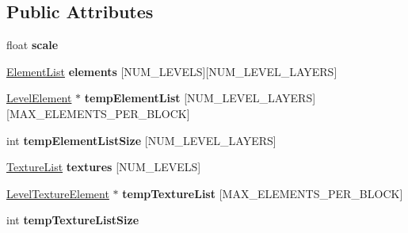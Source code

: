 \subsection*{\-Public \-Attributes}
\begin{DoxyCompactItemize}
\item 
\hypertarget{classLevel_a5fc5b06ee2593eb4b56d6ac761316a5a}{
float {\bfseries scale}}
\label{d2/d9d/classLevel_a5fc5b06ee2593eb4b56d6ac761316a5a}

\item 
\hypertarget{classLevel_a30e1326b2b3c9d96aaec266e6123518a}{
\hyperlink{classLevel_acfda2c619231d9623457ebb133ef6b84}{\-Element\-List} {\bfseries elements} \mbox{[}\-N\-U\-M\-\_\-\-L\-E\-V\-E\-L\-S\mbox{]}\mbox{[}\-N\-U\-M\-\_\-\-L\-E\-V\-E\-L\-\_\-\-L\-A\-Y\-E\-R\-S\mbox{]}}
\label{d2/d9d/classLevel_a30e1326b2b3c9d96aaec266e6123518a}

\item 
\hypertarget{classLevel_a619587a5e40034ebe0f3e6b4c61276a1}{
\hyperlink{classLevelElement}{\-Level\-Element} $\ast$ {\bfseries temp\-Element\-List} \mbox{[}\-N\-U\-M\-\_\-\-L\-E\-V\-E\-L\-\_\-\-L\-A\-Y\-E\-R\-S\mbox{]}\mbox{[}\-M\-A\-X\-\_\-\-E\-L\-E\-M\-E\-N\-T\-S\-\_\-\-P\-E\-R\-\_\-\-B\-L\-O\-C\-K\mbox{]}}
\label{d2/d9d/classLevel_a619587a5e40034ebe0f3e6b4c61276a1}

\item 
\hypertarget{classLevel_aa671d688f9ed322f06a9b66fb7d73f69}{
int {\bfseries temp\-Element\-List\-Size} \mbox{[}\-N\-U\-M\-\_\-\-L\-E\-V\-E\-L\-\_\-\-L\-A\-Y\-E\-R\-S\mbox{]}}
\label{d2/d9d/classLevel_aa671d688f9ed322f06a9b66fb7d73f69}

\item 
\hypertarget{classLevel_a8e49a146fcafe25fa234be3103f1a49a}{
\hyperlink{classLevel_a428c83121a224ffd28a71b01d808352b}{\-Texture\-List} {\bfseries textures} \mbox{[}\-N\-U\-M\-\_\-\-L\-E\-V\-E\-L\-S\mbox{]}}
\label{d2/d9d/classLevel_a8e49a146fcafe25fa234be3103f1a49a}

\item 
\hypertarget{classLevel_a31c9042b0321a0156cab6940f18d84a1}{
\hyperlink{classLevelTextureElement}{\-Level\-Texture\-Element} $\ast$ {\bfseries temp\-Texture\-List} \mbox{[}\-M\-A\-X\-\_\-\-E\-L\-E\-M\-E\-N\-T\-S\-\_\-\-P\-E\-R\-\_\-\-B\-L\-O\-C\-K\mbox{]}}
\label{d2/d9d/classLevel_a31c9042b0321a0156cab6940f18d84a1}

\item 
\hypertarget{classLevel_ac099df327bb9007e550c9c24304cbcc1}{
int {\bfseries temp\-Texture\-List\-Size}}
\label{d2/d9d/classLevel_ac099df327bb9007e550c9c24304cbcc1}

\end{DoxyCompactItemize}
